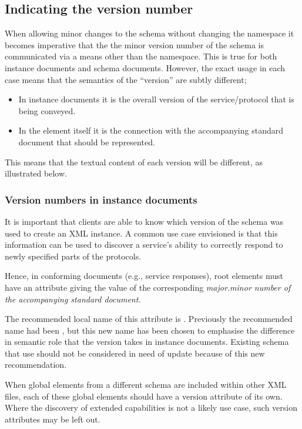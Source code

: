 \documentclass[10pt,a4paper]{ivoa}
\begin{document}
\subsection{Indicating the version number}

When allowing minor changes to the schema without changing the
namespace it becomes imperative that the the minor version number of the schema
is communicated via a means other than the namespace.  This is true for
both instance documents and schema documents. However, the exact usage in each
case means that the semantics of the ``version'' are subtly different;
\begin{itemize}
  \item In instance documents it is the overall version of the service/protocol
  that is being conveyed.
  \item In the  element itself it is the connection with the
  accompanying standard document that should be represented.
\end{itemize}

This means that the textual content of each version will be different, as
illustrated below.

\subsubsection{Version numbers in instance documents}

It is important that
clients are able to know which version of the schema was used to create an XML
instance.  A common use case envisioned is that
this information can be used to discover a service's ability to
correctly respond to newly specified parts of the protocols. 

Hence, in conforming documents (e.g., service responses), 
root elements must have an
attribute giving the value of the corresponding \it{major.minor} number of the
accompanying standard document.

The recommended local name of this attribute is
. Previously the recommended name had been ,
but this new name has been chosen to emphasise the difference in semantic role
that the version takes in instance documents. Existing schema that use
 should not be considered in need of update because of this new
recommendation.

When global elements from a different schema are included within other
XML files, each of these global elements should have a version attribute
of its own.  Where the discovery of extended capabilities is not a
likely use case, such version attributes may be left out.
\end{document}
